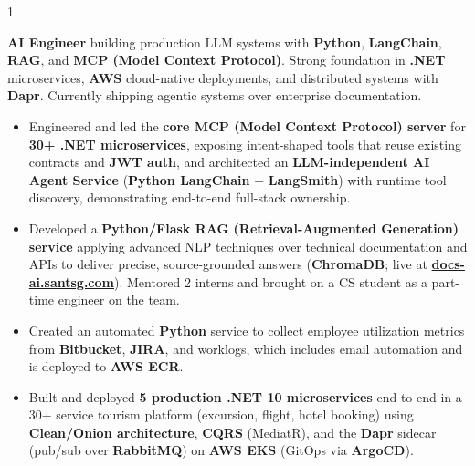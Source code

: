 \documentclass[11pt,a4paper]{altacv}
\makeatletter
\renewcommand{\namefont}{\LARGE\bfseries}
\renewcommand{\taglinefont}{\normalsize\bfseries}
\renewcommand{\personalinfofont}{\footnotesize}
\renewcommand{\makecvheader}{%
  \begingroup
    \begin{minipage}{\linewidth}%
    \raggedright%
    {\namefont\color{name}\MakeUppercase{\@name}\par}
    \smallskip
    {\taglinefont\color{tagline}\@tagline\par}
    \smallskip
    {\personalinfofont\@personalinfo\par}
    \end{minipage}\par%
  \endgroup
}
\makeatother
\begin{document}


\begin{fullwidth}
\makecvheader
\end{fullwidth}

\begin{paracol}{1}

\textbf{AI Engineer} building production LLM systems with \textbf{Python}, \textbf{LangChain}, \textbf{RAG}, and \textbf{MCP (Model Context Protocol)}. Strong foundation in \textbf{.NET} microservices, \textbf{AWS} cloud-native deployments, and distributed systems with \textbf{Dapr}. Currently shipping agentic systems over enterprise documentation.


\begin{itemize}
  \item Engineered and led the \textbf{core MCP (Model Context Protocol) server} for \textbf{30+ .NET microservices}, exposing intent-shaped tools that reuse existing contracts and \textbf{JWT auth}, and architected an \textbf{LLM-independent AI Agent Service} (\textbf{Python LangChain} + \textbf{LangSmith}) with runtime tool discovery, demonstrating end-to-end full-stack ownership.
  \item Developed a \textbf{Python/Flask RAG (Retrieval-Augmented Generation) service} applying advanced NLP techniques over technical documentation and APIs to deliver precise, source-grounded answers (\textbf{ChromaDB}; live at \href{https://docs-ai.santsg.com}{\textbf{docs-ai.santsg.com}}). Mentored 2 interns and brought on a CS student as a part-time engineer on the team.
  \item Created an automated \textbf{Python} service to collect employee utilization metrics from \textbf{Bitbucket}, \textbf{JIRA}, and worklogs, which includes email automation and is deployed to \textbf{AWS ECR}.
  \item Built and deployed \textbf{5 production .NET 10 microservices} end-to-end in a 30+ service tourism platform (excursion, flight, hotel booking) using \textbf{Clean/Onion architecture}, \textbf{CQRS} (MediatR), and the \textbf{Dapr} sidecar (pub/sub over \textbf{RabbitMQ}) on \textbf{AWS EKS} (GitOps via \textbf{ArgoCD}).
\end{itemize}


\end{paracol}
\end{document}
